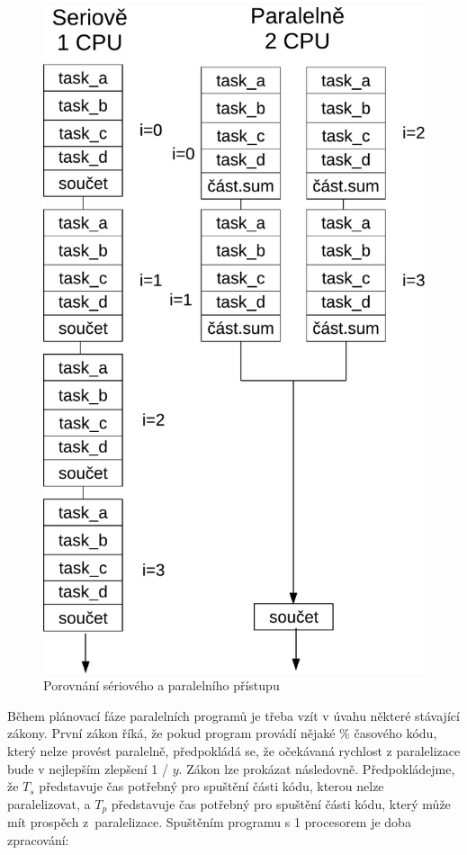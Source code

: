 \begin{figure}
  \begin{center}
    \includegraphics[scale=.6]{obr/serialvspara}
  \end{center}
  \caption{Porovnání sériového a paralelního přístupu}
  \label{obr:serialvspara}
\end{figure}

Během plánovací fáze paralelních programů je třeba vzít v úvahu některé stávající zákony. První zákon říká, že pokud program provádí nějaké \% časového kódu, který nelze provést paralelně, předpokládá se, že očekávaná rychlost z paralelizace bude v nejlepším zlepšení 1 / $y$. Zákon lze prokázat následovně. Předpokládejme, že $T_s$ představuje čas potřebný pro spuštění části kódu, kterou nelze paralelizovat, a $T_p$ představuje čas potřebný pro spuštění části kódu, který může mít prospěch z~paralelizace. Spuštěním programu s 1 procesorem je doba zpracování:


